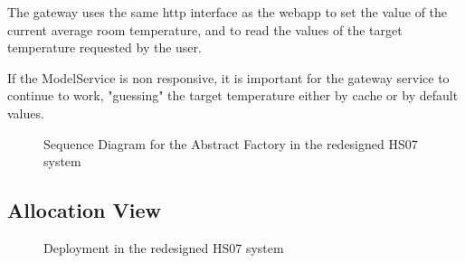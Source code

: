 \documentclass[a4paper,10pt]{article}
\begin{document}
The gateway uses the same http interface as the webapp to set the value of the current average room temperature, and to read the values of the target temperature requested by the user.

If the ModelService is non responsive, it is important for the gateway service to continue to work, "guessing" the target temperature either by cache or by default values.

\begin{figure}[!htb]
\centerline{}
\caption{Sequence Diagram for the Abstract Factory in the redesigned HS07 system}
\label{fig:seq-tfac}
\end{figure}

\clearpage

\subsection{Allocation View}

\begin{figure}[!htb]
\centerline{}
\caption{Deployment in the redesigned HS07 system}
\label{fig:deployment}
\end{figure}

\clearpage




\end{document}
